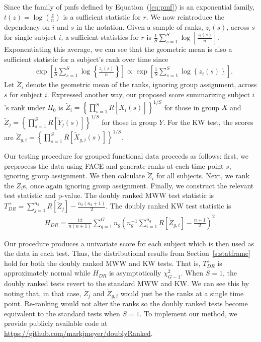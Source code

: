 \documentclass[12pt]{article}
\theoremstyle{plain}
\begin{document}
Since the family of pmfs defined by Equation~(\ref{eq:pmf}) is an exponential family, $t(z) = \log\left( \frac{z}{n} \right)$ is a sufficient statistic for $r$. We now reintroduce the dependency on $i$ and $s$ in the notation. Given a sample of ranks, $z_i(s)$, across $s$ for single subject $i$, a sufficient statistics for $r$ is $\frac{1}{S} \sum_{s=1}^S \log\left[ \frac{z_i(s)}{n} \right]$. Exponentiating this average, we can see that the geometric mean is also a sufficient statistic for a subject's rank over time since
\begin{align*}
	&\exp\left[ \frac{1}{S} \sum_{s=1}^S \log\left\{ \frac{z_i(s)}{n} \right\} \right] 
	\propto\exp\left[ \frac{1}{S} \sum_{s=1}^S \log\left\{z_i(s)\right\}\right].
\end{align*}
Let $\breve{Z}_i$ denote the geometric mean of the ranks, ignoring group assignment, across $s$ for subject $i$. Expressed another way, our proposed score summarizing subject $i$'s rank under $H_0$ is $\breve{Z}_i = \left\{ \prod_{s=1}^S R\left[ \tilde{X}_i(s) \right] \right\}^{1/S}$ for those in group $X$ and $\breve{Z}_j = \left\{ \prod_{s=1}^S R\left[ \tilde{Y}_j(s) \right] \right\}^{1/S}$ for those in group $Y$. For the KW test, the scores are $\breve{Z}_{g,i} = \left\{ \prod_{s=1}^S R\left[ \tilde{X}_{g,i}(s) \right] \right\}^{1/S}$.

	
	Our testing procedure for grouped functional data proceeds as follows: first, we preprocess the data using FACE and generate ranks at each time point $s$, ignoring group assignment. We then calculate $\breve{Z}_i$ for all subjects. Next, we rank the $\breve{Z}_i$s, once again ignoring group assignment. Finally, we construct the relevant test statistic and p-value. The doubly ranked MWW test statistic is $T_{DR}^+ = \sum_{j=1}^{n_2} R\left[ \breve{Z}_{j} \right] - \frac{n_2(n_2 + 1)}{2}$. The doubly ranked KW test statistic is 
\begin{align*}
		H_{DR} = \frac{12}{n(n+1)} \sum_{g = 1}^G n_{g} \left( n_g^{-1} \sum_{i=1}^{n_g} R[\breve{Z}_{g,i}] - \frac{n+1}{2}\right)^2.
\end{align*}

	Our procedure produces a univariate score for each subject which is then used as the data in each test. Thus, the distributional results from Section~\ref{s:statframe} hold for both the doubly ranked MWW and KW tests. That is, $T_{DR}^+$ is approximately normal while $H_{DR}$ is asymptotically $\chi_{G-1}^2$. When $S = 1$, the doubly ranked tests revert to the standard MWW and KW. We can see this by noting that, in that case, $\breve{Z}_{j}$ and $\breve{Z}_{g,i}$ would just be the ranks at a single time point. Re-ranking would not alter the ranks so the doubly ranked tests become equivalent to the standard tests when $S = 1$. To implement our method, we provide publicly available code at \url{https://github.com/markjmeyer/doublyRanked}.
\end{document}

